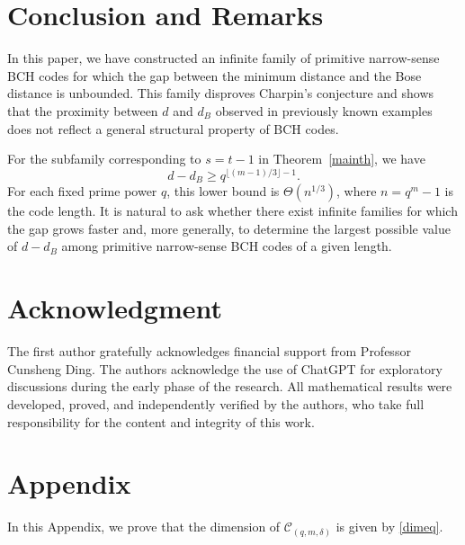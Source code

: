 \documentclass[journal,onecolumn]{IEEEtran}
\begin{document}
\section{Conclusion and Remarks}\label{conclusion}
In this paper, we have constructed an infinite family of primitive
narrow-sense BCH codes for which the gap between the minimum distance
and the Bose distance is unbounded. This family disproves Charpin's
conjecture and shows that the proximity between $d$ and $d_B$ observed
in previously known examples does not reflect a general structural
property of BCH codes. 

For the subfamily corresponding to $s=t-1$ in
Theorem~\ref{mainth}, we have
\begin{equation*}
d-d_B\geq q^{\lfloor(m-1)/3\rfloor-1}.
\end{equation*}
For each fixed prime power $q$, this lower bound is
$\Theta(n^{1/3})$, where $n=q^m-1$ is the code length. It is natural to ask whether there
exist infinite families for which the gap grows faster and, more
generally, to determine the largest possible value of $d-d_B$ among
primitive narrow-sense BCH codes of a given length. 





\section*{Acknowledgment}
The first author gratefully acknowledges financial support from Professor Cunsheng Ding. The authors acknowledge the use of  ChatGPT for exploratory discussions during the early phase of the research.  All mathematical results were developed, proved, and independently verified by the authors, who take full responsibility for the content and integrity of this work.


\section{Appendix} \label{append}

In this Appendix, we prove that the dimension of
$\mathcal{C}_{(q,m,\delta)}$ is given by \eqref{dimeq}. 
\end{document}
